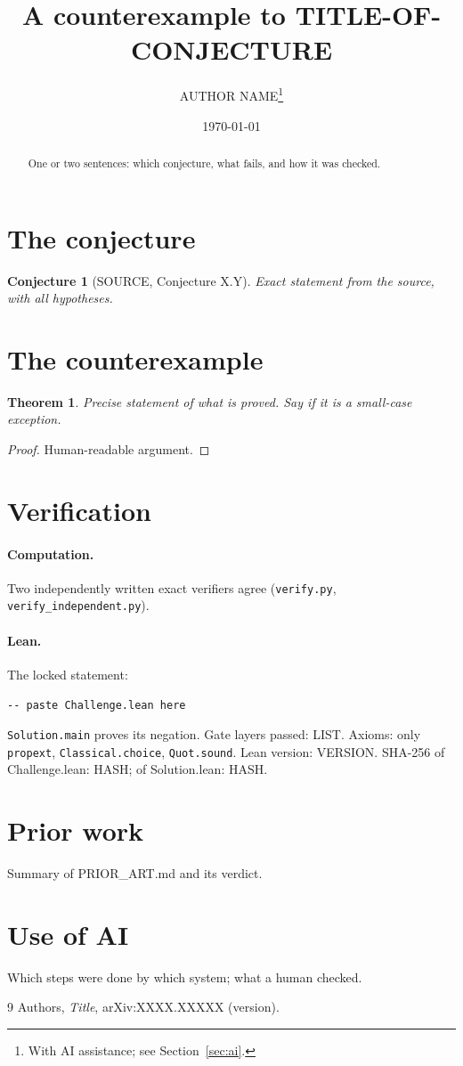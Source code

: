 \documentclass[11pt]{article}
\title{A counterexample to TITLE-OF-CONJECTURE}
\author{AUTHOR NAME\thanks{With AI assistance; see Section~\ref{sec:ai}.}}
\date{\today}
\newtheorem{conjecture}{Conjecture}
\newtheorem{theorem}{Theorem}
\begin{document}
\maketitle

\begin{abstract}
One or two sentences: which conjecture, what fails, and how it was checked.
\end{abstract}

\section{The conjecture}
\begin{conjecture}[SOURCE, Conjecture X.Y]
Exact statement from the source, with all hypotheses.
\end{conjecture}

\section{The counterexample}
\begin{theorem}
Precise statement of what is proved. Say if it is a small-case exception.
\end{theorem}
\begin{proof}
Human-readable argument.
\end{proof}

\section{Verification}
\paragraph{Computation.} Two independently written exact verifiers agree (\texttt{verify.py},
\texttt{verify\_independent.py}).
\paragraph{Lean.} The locked statement:
\begin{lstlisting}
-- paste Challenge.lean here
\end{lstlisting}
\texttt{Solution.main} proves its negation. Gate layers passed: LIST.
Axioms: only \texttt{propext}, \texttt{Classical.choice}, \texttt{Quot.sound}.
Lean version: VERSION. SHA-256 of Challenge.lean: HASH; of Solution.lean: HASH.

\section{Prior work}
Summary of PRIOR\_ART.md and its verdict.

\section{Use of AI}\label{sec:ai}
Which steps were done by which system; what a human checked.

\begin{thebibliography}{9}
 Authors, \emph{Title}, arXiv:XXXX.XXXXX (version).
\end{thebibliography}
\end{document}
